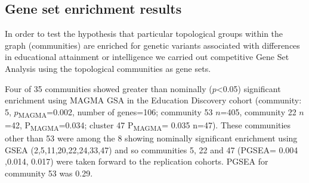 

\subsection{Gene set enrichment results}
In order to test the hypothesis that particular topological groups within the graph (communities) are enriched for genetic variants associated with differences in educational attainment or intelligence we carried out competitive Gene Set Analysis using the topological communities as gene sets. 


Four of 35 communities showed greater than nominally ($p$<0.05) significant enrichment using MAGMA GSA in the Education Discovery cohort (community: 5, $p$\textsubscript{MAGMA}=0.002, number of genes=106; community 53 $n$=405, community 22 $n$=42, P\textsubscript{MAGMA}=0.034; cluster 47 P\textsubscript{MAGMA}= 0.035 n=47). These communities other than 53 were among the 8 showing nominally significant enrichment using GSEA (2,5,11,20,22,24,33,47) and so communities 5, 22 and 47 (PGSEA= 0.004 ,0.014, 0.017) were taken forward to the replication cohorts. PGSEA for community 53 was 0.29. 


